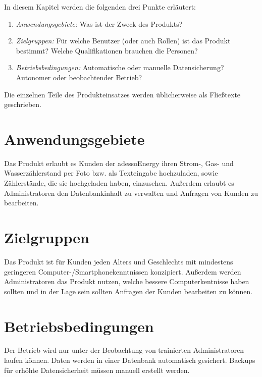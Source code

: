 \begin{tcolorbox}
	In diesem Kapitel werden die folgenden drei Punkte erläutert:
	\begin{enumerate}
		\item \textit{Anwendungsgebiete:} Was ist der Zweck des Produkts?
		\item \textit{Zielgruppen:} Für welche Benutzer (oder auch Rollen) ist das Produkt bestimmt?
		Welche Qualifikationen brauchen die Personen?
		\item \textit{Betriebsbedingungen:} Automatische oder manuelle Datensicherung? 	Autonomer oder beobachtender Betrieb? 	
	\end{enumerate}
	
	\noindent Die einzelnen Teile des Produkteinsatzes werden üblicherweise als Fließtexte geschrieben.
	\end{tcolorbox}
	
	\section{Anwendungsgebiete}
	
	Das Produkt erlaubt es Kunden der adessoEnergy ihren Strom-, Gas- und Wasserzählerstand per Foto bzw. als Texteingabe hochzuladen, sowie Zählerstände, die sie hochgeladen haben, einzusehen.
	Außerdem erlaubt es Administratoren den Datenbankinhalt zu verwalten und Anfragen von Kunden zu bearbeiten.
	
	\section{Zielgruppen}
	
	Das Produkt ist für Kunden jeden Alters und Geschlechts mit mindestens geringeren Computer-/Smartphonekenntnissen konzipiert.
	Außerdem werden Administratoren das Produkt nutzen, welche bessere Computerkentnisse haben sollten und in der Lage sein sollten Anfragen der Kunden bearbeiten zu können.
	
	\section{Betriebsbedingungen}
	
	Der Betrieb wird nur unter der Beobachtung von trainierten Administratoren laufen können. Daten werden in einer Datenbank automatisch gesichert. Backups für erhöhte Datensicherheit müssen manuell erstellt werden.